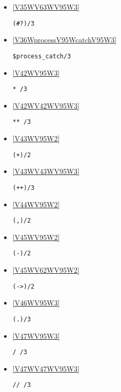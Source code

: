 \begin{itemize}
\item \ref{V35WV63WV95W3} 
\begin{verbatim}
(#?)/3
\end{verbatim}

\item \ref{V36WprocessV95WcatchV95W3} 
\begin{verbatim}
$process_catch/3
\end{verbatim}

\item \ref{V42WV95W3} 
\begin{verbatim}
* /3
\end{verbatim}

\item \ref{V42WV42WV95W3} 
\begin{verbatim}
** /3
\end{verbatim}

\item \ref{V43WV95W2} 
\begin{verbatim}
(+)/2
\end{verbatim}

\item \ref{V43WV43WV95W3} 
\begin{verbatim}
(++)/3
\end{verbatim}

\item \ref{V44WV95W2} 
\begin{verbatim}
(,)/2
\end{verbatim}

\item \ref{V45WV95W2} 
\begin{verbatim}
(-)/2
\end{verbatim}

\item \ref{V45WV62WV95W2} 
\begin{verbatim}
(->)/2
\end{verbatim}

\item \ref{V46WV95W3} 
\begin{verbatim}
(.)/3
\end{verbatim}

\item \ref{V47WV95W3} 
\begin{verbatim}
/ /3
\end{verbatim}

\item \ref{V47WV47WV95W3} 
\begin{verbatim}
// /3
\end{verbatim}


\end{itemize}

